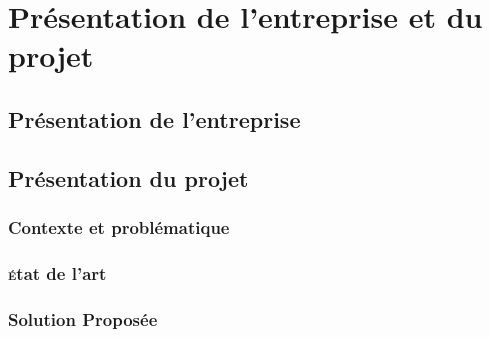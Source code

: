 \pagebreak
\section{Présentation de l'entreprise et du projet}

\subsection{Présentation de l'entreprise}

\subsection{Présentation du projet}

\subsubsection{Contexte et problématique}

\subsubsection{\textsc{é}tat de l'art}

\subsubsection{Solution Proposée}


